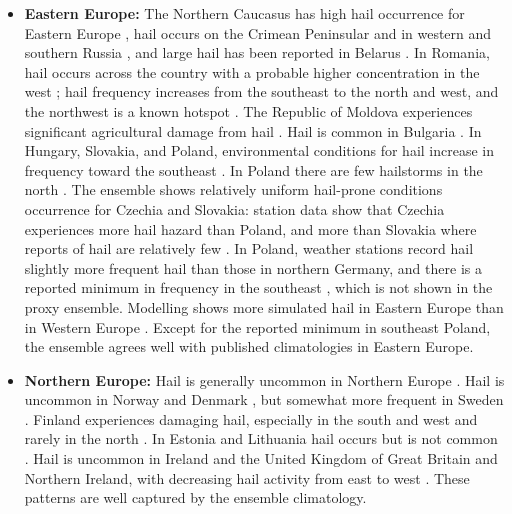 \documentclass[pdflatex, sn-nature]{sn-jnl}\usepackage[]{graphicx}\usepackage[]{xcolor}
\begin{document}
\begin{itemize}
    \item \textbf{Eastern Europe:} The Northern Caucasus has high hail
    occurrence for Eastern Europe \citep{Malkarova_RMH_2011,
    Zharashuev_RMH_2012, Punge_AR_2016}, hail occurs on the Crimean Peninsular
    \citep{Zharashuev_RMH_2012} and in western and southern Russia \citep[][and
    references therein]{Punge_AR_2016}, and large hail has been reported in
    Belarus \citep{Punge_AR_2016}.  In Romania, hail occurs across the country
    \citep{Istrate_GT_2017} with a probable higher concentration in the west
    \citep{Burcea_MWR_2016}; hail frequency increases from the southeast to the
    north and west, and the northwest is a known hotspot \citep{Punge_AR_2016}.
    The Republic of Moldova experiences significant agricultural damage from
    hail \citep{Potapov_RMH_2007}. Hail is common in Bulgaria
    \citep{Simeonov_AR_2009}. In Hungary, Slovakia, and Poland, environmental
    conditions for hail increase in frequency toward the southeast
    \citep{Mohr_GRL_2015}. In Poland there are few hailstorms in the north
    \citep[][and citations therein]{Punge_AR_2016}. The ensemble shows
    relatively uniform hail-prone conditions occurrence for Czechia and
    Slovakia: station data show that Czechia experiences more hail hazard than
    Poland, and more than Slovakia where reports of hail are relatively few
    \citep{Punge_AR_2016}. In Poland, weather stations record hail slightly more
    frequent hail than those in northern Germany, and there is a reported
    minimum in frequency in the southeast \citep{Suwala_QG_2013}, which is not
    shown in the proxy ensemble. Modelling shows more simulated hail in Eastern
    Europe than in Western Europe \citep{Cui_JGRA_2025}. Except for the reported
    minimum in southeast Poland, the ensemble agrees well with published
    climatologies in Eastern Europe.

    \item \textbf{Northern Europe:} Hail is generally uncommon in Northern
    Europe \citep{Punge_AR_2016}. Hail is uncommon in Norway and Denmark
    \citep{Tuovinen_MWR_2009}, but somewhat more frequent in Sweden \citep[][and
    references therein]{Punge_AR_2016}. Finland experiences damaging hail,
    especially in the south and west and rarely in the north
    \citep{Tuovinen_MWR_2009}. In Estonia and Lithuania hail occurs but is not
    common \citep[][and references therein]{Punge_AR_2016}. Hail is uncommon in
    Ireland and the United Kingdom of Great Britain and Northern Ireland, with
    decreasing hail activity from east to west \citep{Mohr_GRL_2015,
    Punge_AR_2016}. These patterns are well captured by the ensemble
    climatology.


\end{itemize}
\end{document}
